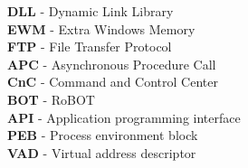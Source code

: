 \textbf{DLL} - Dynamic Link Library \\
\textbf{EWM} - Extra Windows Memory \\
\textbf{FTP} - File Transfer Protocol \\
\textbf{APC} - Asynchronous Procedure Call \\
\textbf{CnC} - Command and Control Center \\
\textbf{BOT} - RoBOT \\
\textbf{API} - Application programming interface \\
\textbf{PEB} - Process environment block \\
\textbf{VAD} - Virtual address descriptor \\